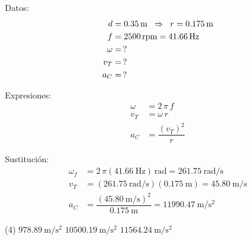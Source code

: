 \documentclass[12pt, letter]{exam}
\begin{document}
\begin{questions}
    \begin{minipage}[t]{0.4\linewidth}
    Datos: 
    \begin{align*}
    d &= \SI{0.35}{\meter} \hspace{0.2cm} \Rightarrow \hspace{0.2cm} r = \SI{0.175}{\meter} \\
    f &= 2500 \, \text{rpm} = \SI{41.66}{\hertz} \\
    \omega &= \, ? \\
    v_{T} &= \, ? \\
    a_{C} &= \, ?
    \end{align*}
    \end{minipage}
    \hspace{1cm}
    \begin{minipage}[t]{0.4\linewidth}
    Expresiones:
    \begin{align*}
    \omega &= 2 \, \pi \, f \\
    v_{T} &= \omega \, r \\
    a_{C} &= \dfrac{\left( v_{T} \right)^{2}}{r}
    \end{align*}
    \end{minipage}

    Sustitución:
    \begin{align*}
    \omega_{f} &= 2 \, \pi (\SI{41.66}{\hertz}) \, \unit{\radian} = \SI[per-mode=fraction]{261.75}{\radian\per\second} \\[0.5em]
    v_{T} &= \left( \SI[per-mode=fraction]{261.75}{\radian\per\second} \right) \left( \SI{0.175}{\meter} \right) = \SI[per-mode=fraction]{45.80}{\meter\per\second} \\[0.5em]
    a_{C} &= \dfrac{\left( \displaystyle \SI[per-mode=fraction]{45.80}{\meter\per\second} \right)^{2}}{\SI{0.175}{\meter}} = \SI[per-mode=fraction]{11990.47}{\meter\per\square\second}
    \end{align*}

    \vspace{0.3cm}
    \begin{tasks}(4)
        \task $\displaystyle \SI[per-mode=fraction]{978.89}{\meter\per\square\second}$
        \task $\displaystyle \SI[per-mode=fraction]{10500.19}{\meter\per\square\second}$
        \task $\displaystyle \SI[per-mode=fraction]{11564.24}{\meter\per\square\second}$
        \task {}
    \end{tasks}


\end{questions}
\end{document}
